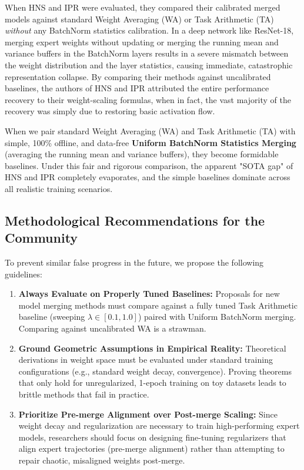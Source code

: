 \documentclass{article}
\theoremstyle{plain}
\theoremstyle{definition}
\theoremstyle{remark}
\begin{document}
When HNS and IPR were evaluated, they compared their calibrated merged models against standard Weight Averaging (WA) or Task Arithmetic (TA) \textit{without} any BatchNorm statistics calibration. In a deep network like ResNet-18, merging expert weights without updating or merging the running mean and variance buffers in the BatchNorm layers results in a severe mismatch between the weight distribution and the layer statistics, causing immediate, catastrophic representation collapse. By comparing their methods against uncalibrated baselines, the authors of HNS and IPR attributed the entire performance recovery to their weight-scaling formulas, when in fact, the vast majority of the recovery was simply due to restoring basic activation flow.

When we pair standard Weight Averaging (WA) and Task Arithmetic (TA) with simple, 100\% offline, and data-free \textbf{Uniform BatchNorm Statistics Merging} (averaging the running mean and variance buffers), they become formidable baselines. Under this fair and rigorous comparison, the apparent "SOTA gap" of HNS and IPR completely evaporates, and the simple baselines dominate across all realistic training scenarios.

\subsection{Methodological Recommendations for the Community}

To prevent similar false progress in the future, we propose the following guidelines:
\begin{enumerate}
    \item \textbf{Always Evaluate on Properly Tuned Baselines:} Proposals for new model merging methods must compare against a fully tuned Task Arithmetic baseline (sweeping $\lambda \in [0.1, 1.0]$) paired with Uniform BatchNorm merging. Comparing against uncalibrated WA is a strawman.
    \item \textbf{Ground Geometric Assumptions in Empirical Reality:} Theoretical derivations in weight space must be evaluated under standard training configurations (e.g., standard weight decay, convergence). Proving theorems that only hold for unregularized, 1-epoch training on toy datasets leads to brittle methods that fail in practice.
    \item \textbf{Prioritize Pre-merge Alignment over Post-merge Scaling:} Since weight decay and regularization are necessary to train high-performing expert models, researchers should focus on designing fine-tuning regularizers that align expert trajectories (pre-merge alignment) rather than attempting to repair chaotic, misaligned weights post-merge.
\end{enumerate}
\end{document}
